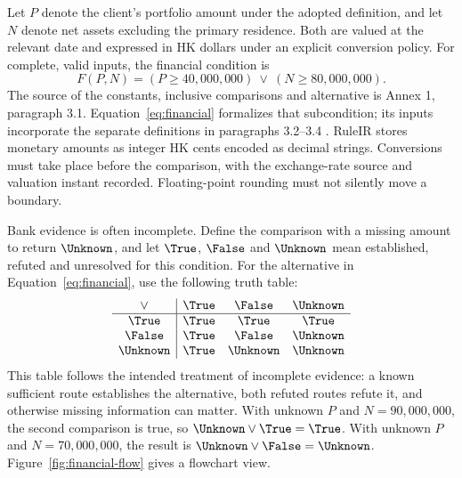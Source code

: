 Let $P$ denote the client's portfolio amount under the adopted definition, and
let $N$ denote net assets excluding the primary residence. Both are valued at the
relevant date and expressed in HK dollars under an explicit conversion policy.
For complete, valid inputs, the financial condition is
\begin{equation}
 F(P,N)=(P\geq 40{,}000{,}000)\ \lor\ (N\geq 80{,}000{,}000).
 \label{eq:financial}
\end{equation}
The source of the constants, inclusive comparisons and alternative is Annex 1,
paragraph 3.1. Equation~\eqref{eq:financial} formalizes that subcondition; its
inputs incorporate the separate definitions in paragraphs 3.2--3.4
\citep{sfcspiannex1}. RuleIR stores monetary amounts as
integer HK cents encoded as decimal strings. Conversions must take place
before the comparison, with the exchange-rate source and valuation instant
recorded. Floating-point rounding must not silently move a boundary.

Bank evidence is often incomplete. Define the comparison with a missing amount
to return $\Unknown$, and let $\True$, $\False$ and $\Unknown$ mean established,
refuted and unresolved for this condition. For the alternative in
Equation~\eqref{eq:financial}, use the following truth table:
\begin{equation}
\begin{array}{c|ccc}
\lor & \True & \False & \Unknown\\\hline
\True & \True & \True & \True\\
\False & \True & \False & \Unknown\\
\Unknown & \True & \Unknown & \Unknown
\end{array}
\label{eq:or}
\end{equation}
This table follows the intended treatment of incomplete evidence: a known
sufficient route establishes the alternative, both refuted routes refute it,
and otherwise missing information can matter. With unknown $P$ and
$N=90{,}000{,}000$, the second comparison is true, so
$\Unknown\lor\True=\True$. With unknown $P$ and $N=70{,}000{,}000$, the result
is $\Unknown\lor\False=\Unknown$. Figure~\ref{fig:financial-flow} gives a
flowchart view.

